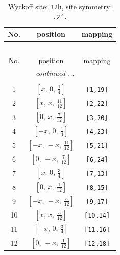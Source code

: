 \documentclass[fleqn,8pt]{jsarticle}
\begin{document}
\begin{longtable}{ccc}
\caption{Wyckoff site: {\tt 12h}, site symmetry: {\tt .2'.}}
 \\
 \hline \hline
No. & position & mapping \\ \hline \endfirsthead

\multicolumn{2}{l}{\tablename\ \thetable{}} \\
 \hline \hline
No. & position & mapping \\ \hline \endhead

 \hline \hline
\multicolumn{2}{r}{\footnotesize\it continued ...} \\ \endfoot

 \hline \hline
\multicolumn{2}{r}{} \\ \endlastfoot

1 & $\left[ x,\, 0,\, \frac{1}{4} \right]$ & {\tt [1,19]} \\ \hline
2 & $\left[ x,\, x,\, \frac{11}{12} \right]$ & {\tt [2,22]} \\ \hline
3 & $\left[ 0,\, x,\, \frac{7}{12} \right]$ & {\tt [3,20]} \\ \hline
4 & $\left[ - x,\, 0,\, \frac{1}{4} \right]$ & {\tt [4,23]} \\ \hline
5 & $\left[ - x,\, - x,\, \frac{11}{12} \right]$ & {\tt [5,21]} \\ \hline
6 & $\left[ 0,\, - x,\, \frac{7}{12} \right]$ & {\tt [6,24]} \\ \hline
7 & $\left[ x,\, 0,\, \frac{3}{4} \right]$ & {\tt [7,13]} \\ \hline
8 & $\left[ 0,\, x,\, \frac{1}{12} \right]$ & {\tt [8,15]} \\ \hline
9 & $\left[ - x,\, - x,\, \frac{5}{12} \right]$ & {\tt [9,17]} \\ \hline
10 & $\left[ x,\, x,\, \frac{5}{12} \right]$ & {\tt [10,14]} \\ \hline
11 & $\left[ - x,\, 0,\, \frac{3}{4} \right]$ & {\tt [11,16]} \\ \hline
12 & $\left[ 0,\, - x,\, \frac{1}{12} \right]$ & {\tt [12,18]} \\
\end{longtable}
\renewcommand{\arraystretch}{1.2}
\end{document}
